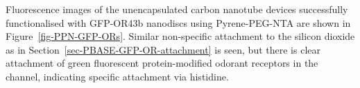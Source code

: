 \documentclass[
  a4paper,
]{scrbook}
\begin{document}
Fluorescence images of the unencapsulated carbon nanotube devices
successfully functionalised with GFP-OR43b nanodiscs using
Pyrene-PEG-NTA are shown in Figure~\ref{fig-PPN-GFP-ORs}. Similar
non-specific attachment to the silicon dioxide as in
Section~\ref{sec-PBASE-GFP-OR-attachment} is seen, but there is clear
attachment of green fluorescent protein-modified odorant receptors in
the channel, indicating specific attachment via histidine.

\begin{figure}

\begin{minipage}[t]{0.47\linewidth}

{\centering 


}

\subcaption{\label{fig-PPN-GFP-OR-1}}
\end{minipage}%
%
\begin{minipage}[t]{0.05\linewidth}

{\centering 

~

}

\end{minipage}%
%
\begin{minipage}[t]{0.47\linewidth}

{\centering 

\raisebox{-\height}{

}}
\end{minipage}
\end{figure}
\end{document}
